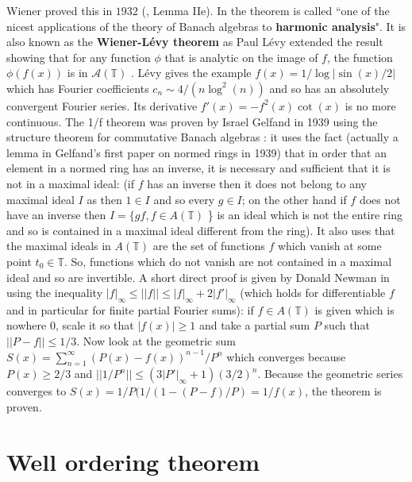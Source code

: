 \documentclass[12pt]{amsart}
\newcommand{\A}{\mathcal{A}} \newcommand{\G}{\mathcal{G}} \newcommand{\R}{\mathcal{R}}
\newcounter{example}    \def\example#1{ \item \fontsize{12}{15} \selectfont #1 \fontsize{12}{15} \selectfont }
\begin{document}
Wiener proved this in $1932$ (\cite{WienerTauberian}, Lemma IIe). 
In \cite{Katznelson} the theorem is called ``one of the nicest applications of
the theory of Banach algebras to {\bf harmonic analysis}". It is also known as the 
{\bf Wiener-L\'evy theorem} as Paul L\'evy extended the result showing that for any function $\phi$
that is analytic on the image of $f$, the function $\phi(f(x))$ is in $\A(\mathbb{T})$ \cite{Levy1935}.
L\'evy gives the example $f(x)=1/\log|\sin(x)/2|$ which has Fourier coefficients $c_n \sim 4/(n \log^2(n))$
and so has an absolutely convergent Fourier series. Its derivative $f'(x)=-f^2(x) \cot(x)$ is no 
more continuous. The 1/f theorem was proven by Israel Gelfand in 1939 using the structure theorem for 
commutative Banach algebras \cite{GelfandCollectedPapers,Zimmer1990}: 
it uses the fact (actually a lemma in Gelfand's
first paper on normed rings in 1939) that in order that an element in a normed ring has an inverse, it is 
necessary and sufficient that it is not in a maximal ideal: (if $f$ has an inverse then it does not
belong to any maximal ideal $I$ as then $1 \in I$ and so every $g \in I$; on the other hand if
$f$ does not have an inverse then $I=\{ gf, f \in A(\mathbb{T})$ \} is an ideal which is not the entire ring
and so is contained in a maximal ideal different from the ring). It also uses that the maximal ideals in $A(\mathbb{T})$ 
are the set of functions $f$ which vanish at some point $t_0 \in \mathbb{T}$. So, functions which do not vanish
are not contained in a maximal ideal and so are invertible. 
A short direct proof is given by Donald Newman in \cite{Newman1975}
using the inequality $|f|_{\infty} \leq ||f|| \leq |f|_{\infty} + 2 |f'|_{\infty}$ (which holds for
differentiable $f$ and in particular for finite partial Fourier sums): if $f \in A(\mathbb{T})$
is given which is nowhere $0$, scale it so that $|f(x)| \geq 1$ and take a partial sum $P$ such that $||P-f|| \leq 1/3$.
Now look at the geometric sum $S(x)=\sum_{n=1}^{\infty} (P(x)-f(x))^{n-1}/P^n$ which converges because $P(x) \geq 2/3$ and
$||1/P^n|| \leq (3 |P'|_{\infty}+1) (3/2)^n$. Because the geometric series converges to $S(x)=1/P (1/(1-(P-f)/P) = 1/f(x)$,
the theorem is proven. 


\section{Well ordering theorem}
\end{document}
